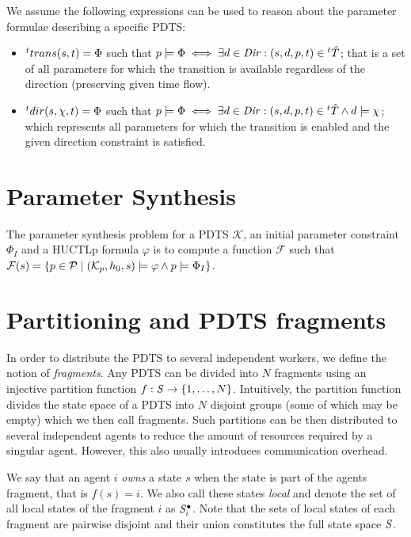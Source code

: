 We assume the following expressions can be used to reason about the parameter formulae describing a specific \ac{PDTS}:

\begin{itemize}
	\item ${}^{t}trans(s,t) = \Phi$ such that $p \models \Phi \iff \exists d \in \mathit{Dir} : (s, d, p, t) \in {}^{t}\hat{T}$; that is a set of all parameters for which the transition is available regardless of the direction (preserving given time flow).
	\item ${}^{t}dir(s, \chi ,t) = \Phi$ such that $p \models \Phi \iff \exists d \in \mathit{Dir} : (s, d, p, t) \in {}^{t}\hat{T} \land d \models \chi$; which represents all parameters for which the transition is enabled and the given direction constraint is satisfied.
\end{itemize}


\section{Parameter Synthesis}

The parameter synthesis problem for a \ac{PDTS} $\mathcal{K}$, an initial parameter constraint $\Phi_I$ and a \ac{HUCTLp} formula $\varphi$ is to compute a function $\mathcal{F}$ such that $\mathcal{F}(s) = \{p \in \mathcal{P} \mid (\mathcal{K}_p, h_0, s) \models \varphi \land p \models \Phi_I \}$.

\section{Partitioning and \ac{PDTS} fragments}

In order to distribute the \ac{PDTS} to several independent workers, we define the notion of \emph{fragments}. Any \ac{PDTS} can be divided into $N$ fragments using an injective partition function $f: \mathit{S} \to \{1, \ldots, N \}$. Intuitively, the partition function divides the state space of a \ac{PDTS} into $N$ disjoint groups (some of which may be empty) which we then call fragments. Such partitions can be then distributed to several independent agents to reduce the amount of resources required by a singular agent. However, this also usually introduces communication overhead. 

We say that an agent $i$ \emph{owns} a state $s$ when the state is part of the agents fragment, that is $f(s) = i$. We also call these states \emph{local} and denote the set of all local states of the fragment $i$ as $\mathit{S}^\bullet_i$. Note that the sets of local states of each fragment are pairwise disjoint and their union constitutes the full state space $\mathit{S}$. 

